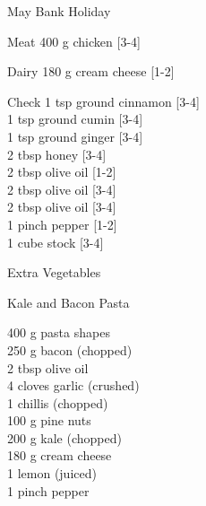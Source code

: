 \begin{menu}{May Bank Holiday}
\begin{shoppinglist}{Meat}
      400 g chicken 
        {\scriptsize[3-4]}\\
      \end{shoppinglist}%
      \begin{shoppinglist}{Dairy}
      180 g cream cheese 
        {\scriptsize[1-2]}\\
      \end{shoppinglist}%
      \par\vfil %
      \vfil\clearpage %
      \begin{shoppinglist}{Check}
      1 tsp ground cinnamon 
        {\scriptsize[3-4]}\\
      1 tsp ground cumin 
        {\scriptsize[3-4]}\\
      1 tsp ground ginger 
        {\scriptsize[3-4]}\\
      2 tbsp honey 
        {\scriptsize[3-4]}\\
      2 tbsp olive oil 
        {\scriptsize[1-2]}\\
      2 tbsp olive oil 
        {\scriptsize[3-4]}\\
      2 tbsp olive oil 
        {\scriptsize[3-4]}\\
      1 pinch pepper 
        {\scriptsize[1-2]}\\
      1 cube stock 
        {\scriptsize[3-4]}\\
      \end{shoppinglist}%
      \begin{shoppinglist}{Extra Vegetables}
      \end{shoppinglist}%
      \par\vfil %
    \vfil\clearpage
  
    \begin{recipe}{2}{Kale and Bacon Pasta}%
    
		\begin{ingredients}
		400 g pasta shapes  \\
	250 g bacon (chopped) \\
	2 tbsp olive oil  \\
	4 cloves garlic (crushed) \\
	1  chillis (chopped) \\
	100 g pine nuts  \\
	200 g kale (chopped) \\
	180 g cream cheese  \\
	1  lemon (juiced) \\
	1 pinch pepper  \\
	

\end{ingredients}
\end{recipe}
\end{menu}
